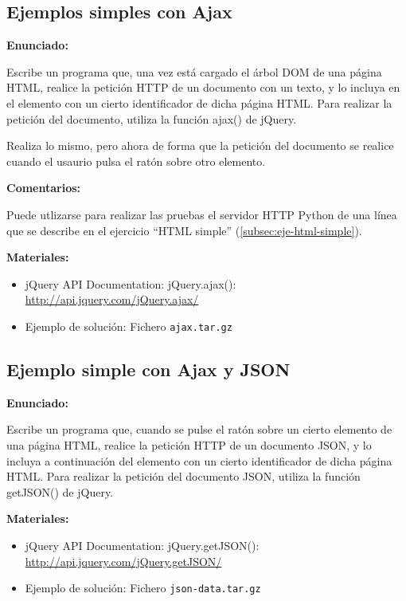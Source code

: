 \subsection{Ejemplos simples con Ajax}
\label{subsec:eje-jquery-ajax}

\textbf{Enunciado:}

Escribe un programa que, una vez está cargado el árbol DOM de una página HTML, realice la petición HTTP de un documento con un texto, y lo incluya en el elemento con un cierto identificador de dicha página HTML. Para realizar la petición del documento, utiliza la función ajax() de jQuery.

Realiza lo mismo, pero ahora de forma que la petición del documento se realice cuando el usaurio pulsa el ratón sobre otro elemento.

\textbf{Comentarios:}

Puede utlizarse para realizar las pruebas el servidor HTTP Python de una línea que se describe en el ejercicio ``HTML simple'' (\ref{subsec:eje-html-simple}).

\textbf{Materiales:}

\begin{itemize}
\item jQuery API Documentation: jQuery.ajax(): \\
  \url{http://api.jquery.com/jQuery.ajax/}
\item Ejemplo de solución: Fichero \verb|ajax.tar.gz|
\end{itemize}

\subsection{Ejemplo simple con Ajax y JSON}
\label{subsec:eje-jquery-json}

\textbf{Enunciado:}

Escribe un programa que, cuando se pulse el ratón sobre un cierto elemento de una página HTML, realice la petición HTTP de un documento JSON, y lo incluya a continuación del elemento con un cierto identificador de dicha página HTML. Para realizar la petición del documento JSON, utiliza la función getJSON() de jQuery.

\textbf{Materiales:}

\begin{itemize}
\item jQuery API Documentation: jQuery.getJSON(): \\
  \url{http://api.jquery.com/jQuery.getJSON/}
\item Ejemplo de solución: Fichero \verb|json-data.tar.gz|
\end{itemize}

